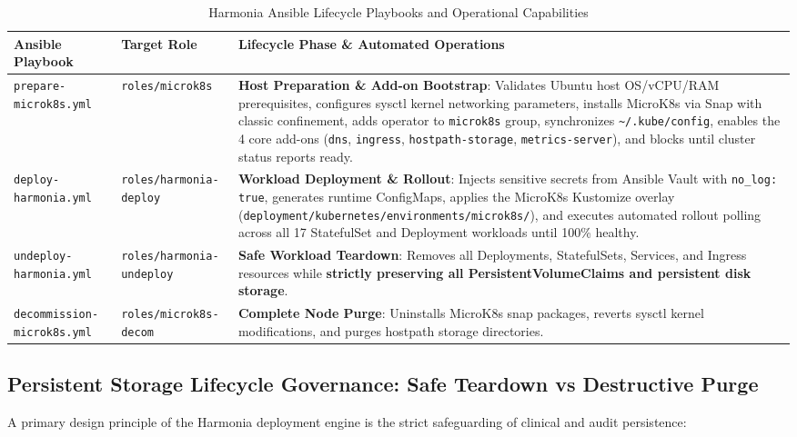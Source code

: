\begin{table}[htbp]
\centering
\small
\begin{tabularx}{\textwidth}{l p{3.8cm} X}
\toprule
\textbf{Ansible Playbook} & \textbf{Target Role} & \textbf{Lifecycle Phase \& Automated Operations} \\
\midrule
\texttt{prepare-microk8s.yml} & \texttt{roles/microk8s} & \textbf{Host Preparation \& Add-on Bootstrap}: Validates Ubuntu host OS/vCPU/RAM prerequisites, configures sysctl kernel networking parameters, installs MicroK8s via Snap with classic confinement, adds operator to \texttt{microk8s} group, synchronizes \texttt{\textasciitilde/.kube/config}, enables the 4 core add-ons (\texttt{dns}, \texttt{ingress}, \texttt{hostpath-storage}, \texttt{metrics-server}), and blocks until cluster status reports ready. \\
\addlinespace
\texttt{deploy-harmonia.yml} & \texttt{roles/harmonia-deploy} & \textbf{Workload Deployment \& Rollout}: Injects sensitive secrets from Ansible Vault with \texttt{no\_log: true}, generates runtime ConfigMaps, applies the MicroK8s Kustomize overlay (\texttt{deployment/kubernetes/environments/microk8s/}), and executes automated rollout polling across all 17 StatefulSet and Deployment workloads until 100\% healthy. \\
\addlinespace
\texttt{undeploy-harmonia.yml} & \texttt{roles/harmonia-undeploy} & \textbf{Safe Workload Teardown}: Removes all Deployments, StatefulSets, Services, and Ingress resources while \textbf{strictly preserving all PersistentVolumeClaims and persistent disk storage}. \\
\addlinespace
\texttt{decommission-microk8s.yml} & \texttt{roles/microk8s-decom} & \textbf{Complete Node Purge}: Uninstalls MicroK8s snap packages, reverts sysctl kernel modifications, and purges hostpath storage directories. \\
\bottomrule
\end{tabularx}
\caption{Harmonia Ansible Lifecycle Playbooks and Operational Capabilities}
\label{tab:ansible_playbooks}
\end{table}

\subsection{Persistent Storage Lifecycle Governance: Safe Teardown vs Destructive Purge}

A primary design principle of the Harmonia deployment engine is the strict safeguarding of clinical and audit persistence:

